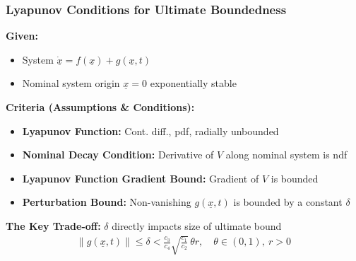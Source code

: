 \documentclass[student, noshadow, lsr, english, aspectratio=169, t]{ITR_LSR_slides}
\begin{document}
\begin{frame}
    \frametitle{Lyapunov Conditions for Ultimate Boundedness}

    \textbf{Given:}
    \begin{itemize}
        \item System $\dot{\underline{x}} = f(\underline{x}) + g(\underline{x}, t)$
        \item Nominal system origin $\underline{x}=0$ exponentially stable
    \end{itemize}
	\vspace{0.3cm}
	\textbf{Criteria (Assumptions \& Conditions):}
    \begin{itemize}
        \item \textbf{Lyapunov Function:} Cont. diff., pdf, radially unbounded
        \item \textbf{Nominal Decay Condition:} Derivative of $V$ along nominal system is ndf
        \item \textbf{Lyapunov Function Gradient Bound:} Gradient of $V$ is bounded
        \item \textbf{Perturbation Bound:} Non-vanishing $g(\underline{x}, t)$ is bounded by a constant $\delta$
    \end{itemize}
	\vspace{0.3cm}
    \textbf{The Key Trade-off:} $\delta$ directly impacts size of ultimate bound
    \begin{align*}
		\|g(\underline{x}, t)\| \leq \delta < \frac{c_3}{c_4} \sqrt{\frac{c_1}{c_2}}\, \theta r, \quad \theta \in (0,1),\ r > 0
	\end{align*}

\end{frame}
\end{document}
